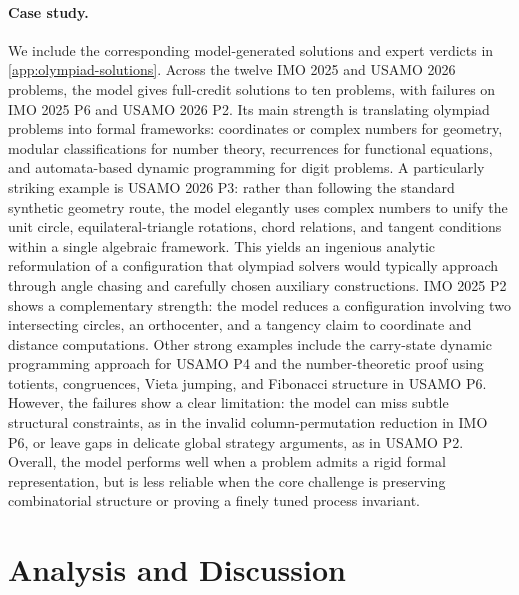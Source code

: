 \documentclass{llmxive}
\begin{document}
\paragraph{Case study.} 
We include the corresponding
model-generated solutions and expert verdicts in
\cref{app:olympiad-solutions}. 
Across the twelve IMO 2025 and USAMO 2026 problems, the model gives full-credit solutions to ten problems, with failures on IMO 2025 P6 and USAMO 2026 P2. Its main strength is translating olympiad problems into formal frameworks: coordinates or complex numbers for geometry, modular classifications for number theory, recurrences for functional equations, and automata-based dynamic programming for digit problems. A particularly striking example is USAMO 2026 P3: rather than following the standard synthetic geometry route, the model elegantly uses complex numbers to unify the unit circle, equilateral-triangle rotations, chord relations, and tangent conditions within a single algebraic framework. This yields an ingenious analytic reformulation of a configuration that olympiad solvers would typically approach through angle chasing and carefully chosen auxiliary constructions. IMO 2025 P2 shows a complementary strength: the model reduces a configuration involving two intersecting circles, an orthocenter, and a tangency claim to coordinate and distance computations. Other strong examples include the carry-state dynamic programming approach for USAMO P4 and the number-theoretic proof using totients, congruences, Vieta jumping, and Fibonacci structure in USAMO P6. However, the failures show a clear limitation: the model can miss subtle structural constraints, as in the invalid column-permutation reduction in IMO P6, or leave gaps in delicate global strategy arguments, as in USAMO P2. Overall, the model performs well when a problem admits a rigid formal representation, but is less reliable when the core challenge is preserving combinatorial structure or proving a finely tuned process invariant.
\section{Analysis and Discussion}



\end{document}

